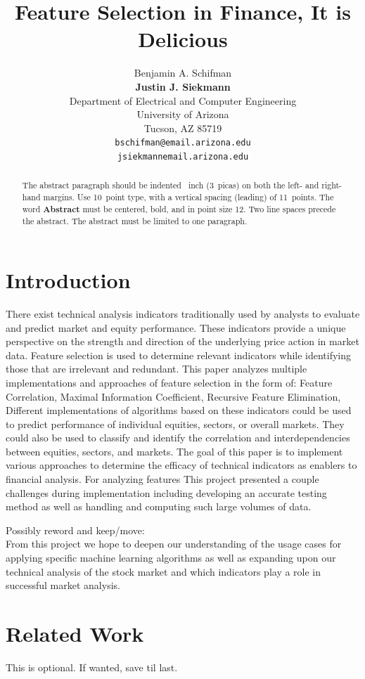 \documentclass{article}\raggedbottom
\title{Feature Selection in Finance, It is Delicious}
\author{
  Benjamin A. Schifman\\
  \textbf{Justin J. Siekmann}\\
  Department of Electrical and Computer Engineering\\
  University of Arizona\\
  Tucson, AZ 85719 \\
  \texttt{bschifman@email.arizona.edu} \\
  \texttt{jsiekmannemail.arizona.edu}
}
\begin{document}
 

\maketitle

\begin{abstract}
	\color{red}
  The abstract paragraph should be indented ~inch
  (3~picas) on both the left- and right-hand margins. Use 10~point
  type, with a vertical spacing (leading) of 11~points.  The word
  \textbf{Abstract} must be centered, bold, and in point size 12. Two
  line spaces precede the abstract. The abstract must be limited to
  one paragraph.
\end{abstract}

\section{\color{red}Introduction}
There exist technical analysis indicators traditionally used by analysts to evaluate and predict market and equity performance. These indicators provide a unique perspective on the strength and direction of the underlying price action in market data. Feature selection is used to determine relevant indicators while identifying those that are irrelevant and redundant. This paper analyzes multiple implementations and approaches of feature selection in the form of: Feature Correlation, Maximal Information Coefficient, Recursive Feature Elimination, Different implementations of algorithms based on these indicators could be used to predict performance of individual equities, sectors, or overall markets. They could also be used to classify and identify the correlation and interdependencies between equities, sectors, and markets. The goal of this paper is to implement various approaches to determine the efficacy of technical indicators as enablers to financial analysis. For analyzing features This project presented a couple challenges during implementation including developing an accurate testing method as well as handling and computing such large volumes of data.

Possibly reword and keep/move:\\
From this project we hope to deepen our understanding of the usage cases for applying specific machine learning algorithms as well as expanding upon our technical analysis of the stock market and which indicators play a role in successful market analysis.

\section{Related Work}
This is optional. If wanted, save til last.
\end{document}
